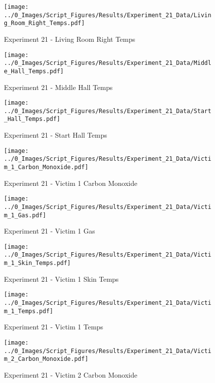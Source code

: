 	\clearpage

	\begin{figure}[H]
		\centering
		\texttt{[image: ../0\_Images/Script\_Figures/Results/Experiment\_21\_Data/Living\_Room\_Right\_Temps.pdf]}
		\caption[]{Experiment 21 - Living Room Right Temps}
	\end{figure}
 

	\begin{figure}[H]
		\centering
		\texttt{[image: ../0\_Images/Script\_Figures/Results/Experiment\_21\_Data/Middle\_Hall\_Temps.pdf]}
		\caption[]{Experiment 21 - Middle Hall Temps}
	\end{figure}
 
	\clearpage

	\begin{figure}[H]
		\centering
		\texttt{[image: ../0\_Images/Script\_Figures/Results/Experiment\_21\_Data/Start\_Hall\_Temps.pdf]}
		\caption[]{Experiment 21 - Start Hall Temps}
	\end{figure}
 

	\begin{figure}[H]
		\centering
		\texttt{[image: ../0\_Images/Script\_Figures/Results/Experiment\_21\_Data/Victim\_1\_Carbon\_Monoxide.pdf]}
		\caption[]{Experiment 21 - Victim 1 Carbon Monoxide}
	\end{figure}
 
	\clearpage

	\begin{figure}[H]
		\centering
		\texttt{[image: ../0\_Images/Script\_Figures/Results/Experiment\_21\_Data/Victim\_1\_Gas.pdf]}
		\caption[]{Experiment 21 - Victim 1 Gas}
	\end{figure}
 

	\begin{figure}[H]
		\centering
		\texttt{[image: ../0\_Images/Script\_Figures/Results/Experiment\_21\_Data/Victim\_1\_Skin\_Temps.pdf]}
		\caption[]{Experiment 21 - Victim 1 Skin Temps}
	\end{figure}
 
	\clearpage

	\begin{figure}[H]
		\centering
		\texttt{[image: ../0\_Images/Script\_Figures/Results/Experiment\_21\_Data/Victim\_1\_Temps.pdf]}
		\caption[]{Experiment 21 - Victim 1 Temps}
	\end{figure}
 

	\begin{figure}[H]
		\centering
		\texttt{[image: ../0\_Images/Script\_Figures/Results/Experiment\_21\_Data/Victim\_2\_Carbon\_Monoxide.pdf]}
		\caption[]{Experiment 21 - Victim 2 Carbon Monoxide}
	\end{figure}
 
